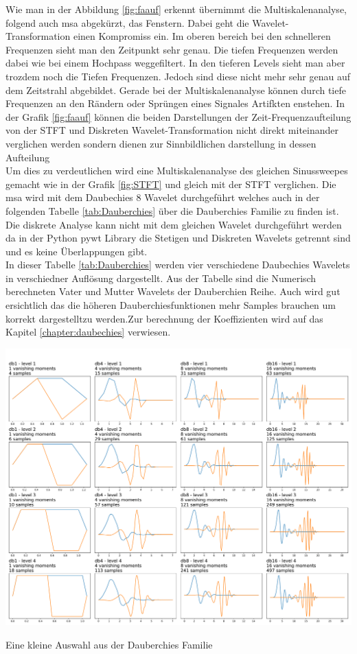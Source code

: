 Wie man in der Abbildung \ref{fig:faauf} erkennt übernimmt die Multiskalenanalyse, folgend auch msa abgekürzt, das Fenstern. Dabei geht die Wavelet-Transformation einen Kompromiss ein. Im oberen bereich bei den schnelleren Frequenzen sieht man den Zeitpunkt sehr genau. Die tiefen Frequenzen werden dabei wie bei einem Hochpass weggefiltert. In den tieferen Levels sieht man aber trozdem noch die Tiefen Frequenzen. Jedoch sind diese nicht mehr sehr genau auf dem Zeitstrahl abgebildet. Gerade bei der Multiskalenanalyse können durch tiefe Frequenzen an den Rändern oder Sprüngen eines Signales Artifkten enstehen. In der Grafik \ref{fig:faauf} können die beiden Darstellungen der Zeit-Frequenzaufteilung von der STFT und Diskreten Wavelet-Transformation nicht direkt miteinander verglichen werden sondern dienen zur Sinnbildlichen darstellung in dessen Aufteilung\\

Um dies zu verdeutlichen wird eine  Multiskalenanalyse des gleichen Sinussweepes gemacht wie in der Grafik \ref{fig:STFT} und gleich mit der STFT verglichen.
Die msa wird mit dem Daubechies 8 Wavelet durchgeführt welches auch in der folgenden Tabelle \ref{tab:Dauberchies} über die Dauberchies Familie zu finden ist. Die diskrete Analyse kann nicht mit dem gleichen Wavelet durchgeführt werden da in der Python pywt Library die Stetigen und Diskreten Wavelets getrennt sind und es keine Überlappungen gibt. \\
In dieser Tabelle \ref{tab:Dauberchies} werden vier verschiedene Daubechies Wavelets in verschiedner Auflösung dargestellt. Aus der Tabelle sind die Numerisch berechneten Vater und Mutter Wavelets der Dauberchien Reihe. Auch wird gut ersichtlich das die höheren Dauberchiesfunktionen mehr Samples brauchen um korrekt dargestelltzu werden.Zur berechnung der Koeffizienten wird auf das Kapitel \ref{chapter:daubechies} verwiesen.\\

\begin{table}
	\includegraphics[width=\linewidth]{papers/autotune/sections/frequenzanalyse/images/DauberchiesFamilie.pdf}
	\caption{Eine kleine Auswahl aus der Dauberchies Familie}
	\label{tab:Dauberchies}
\end{table}


